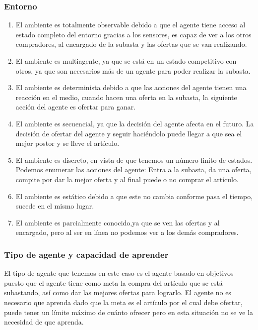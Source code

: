 \documentclass{article}
\begin{document}
            \subsubsection{Entorno}
                \begin{enumerate}
                    \item El ambiente es totalmente observable debido a que el agente tiene acceso al estado completo del entorno gracias a los sensores, es capaz de ver a los otros compradores, al encargado de la subasta y las ofertas que se van realizando.
                    \item El ambiente es multiagente, ya que se está en un estado competitivo con otros, ya que son necesarios más de un agente para poder realizar la subasta.
                    \item El ambiente es determinista debido a que las acciones del agente tienen una reacción en el medio, cuando hacen una oferta en la subasta, la siguiente acción del agente es ofertar para ganar.
                    \item El ambiente es secuencial, ya que la decisión del agente afecta en el futuro. La decisión de ofertar del agente y seguir haciéndolo puede llegar a que sea el mejor postor y se lleve el artículo.
                    \item El ambiente es discreto, en vista de que tenemos un número finito de estados. Podemos enumerar las acciones del agente: Entra a la subasta, da una oferta, compite por dar la mejor oferta y al final puede o no comprar el artículo.
                    \item El ambiente es estático debido a que este no cambia conforme pasa el tiempo, sucede en el mismo lugar.
                    \item El ambiente es parcialmente conocido,ya que se ven las ofertas y al encargado, pero al ser en línea no podemos ver a los demás compradores.
                \end{enumerate}

            \subsubsection{Tipo de agente y capacidad de aprender}
                El tipo de agente que tenemos en este caso es el agente basado en objetivos puesto que el agente tiene como meta la compra del artículo que se está subastando, así como dar las mejores ofertas para lograrlo. El agente no es necesario que aprenda dado que la meta es el artículo por el cual debe ofertar, puede tener un límite máximo de cuánto ofrecer pero en esta situación no se ve la necesidad de que aprenda.
\end{document}
